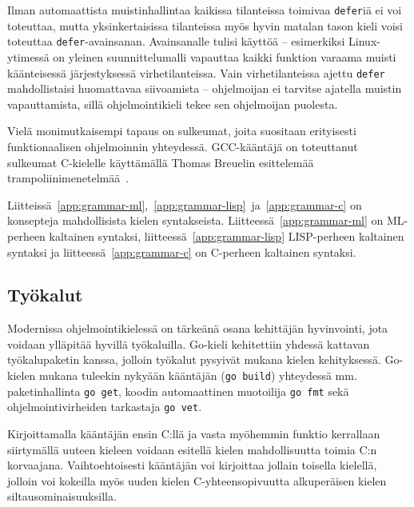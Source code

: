 \FloatBarrier

Ilman automaattista muistinhallintaa kaikissa tilanteissa toimivaa
\texttt{defer}iä ei voi toteuttaa, mutta yksinkertaisissa tilanteissa myös
hyvin matalan tason kieli voisi toteuttaa \texttt{defer}-avainsanan.
Avainsanalle tulisi käyttöä -- esimerkiksi Linux-ytimessä on yleinen
suunnittelumalli vapauttaa kaikki funktion varaama muisti käänteisessä
järjestyksessä virhetilanteissa. Vain virhetilanteissa ajettu \texttt{defer}
mahdollistaisi huomattavaa siivoamista -- ohjelmoijan ei tarvitse ajatella
muistin vapauttamista, sillä ohjelmointikieli tekee sen ohjelmoijan puolesta.

Vielä monimutkaisempi tapaus on sulkeumat, joita suositaan erityisesti
funktionaalisen ohjelmoinnin yhteydessä. GCC-kääntäjä on toteuttanut sulkeumat
C-kielelle käyttämällä Thomas Breuelin esittelemää
trampoliinimenetelmää~\citep{gccnested, cppclosure}.

Liitteissä~\ref{app:grammar-ml},~\ref{app:grammar-lisp}~ja~\ref{app:grammar-c}
on konsepteja mahdollisista kielen syntakseista.
Liitteessä~\ref{app:grammar-ml} on ML-perheen kaltainen syntaksi,
liitteessä~\ref{app:grammar-lisp} LISP-perheen kaltainen syntaksi ja
liitteessä~\ref{app:grammar-c} on C-perheen kaltainen syntaksi.

\subsection{Työkalut}

Modernissa ohjelmointikielessä on tärkeänä osana kehittäjän hyvinvointi, jota
voidaan ylläpitää hyvillä työkaluilla. Go-kieli kehitettiin yhdessä kattavan
työkalupaketin kanssa, jolloin työkalut pysyivät mukana kielen kehityksessä.
Go-kielen mukana tuleekin nykyään kääntäjän (\texttt{go build}) yhteydessä mm.
paketinhallinta \texttt{go get}, koodin automaattinen muotoilija \texttt{go
fmt} sekä ohjelmointivirheiden tarkastaja \texttt{go vet}. 

Kirjoittamalla kääntäjän ensin C:llä ja vasta myöhemmin funktio kerrallaan
siirtymällä uuteen kieleen voidaan esitellä kielen mahdollisuutta toimia C:n
korvaajana. Vaihtoehtoisesti kääntäjän voi kirjoittaa jollain toisella
kielellä, jolloin voi kokeilla myös uuden kielen C-yhteensopivuutta
alkuperäisen kielen siltausominaisuuksilla.
